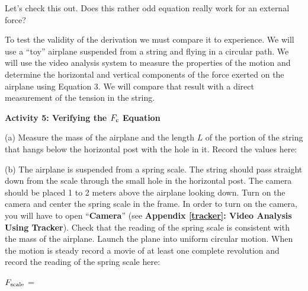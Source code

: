 Let's check this out. Does this rather odd equation really work for an external
force?

To test the validity of the derivation we must compare it to experience. We
will use a ``toy'' airplane suspended from a string and flying
in a circular path. We will use the video analysis system to measure the properties
of the motion and determine the horizontal and vertical components of the force
exerted on the airplane using Equation 3. We will compare that result with a
direct measurement of the tension in the string. 

\textbf{Activity 5: Verifying the \(F_{\rm c} \) Equation }

(a) Measure the mass of the airplane and the length $L$ of the portion of the
string that hangs below the horizontal post with the hole in it. Record the
values here: 
\vspace{10mm}

(b) The airplane is suspended from a spring scale. The string should pass straight down from the scale through the small hole in the horizontal post. The camera should be placed 1 to 2 meters above the airplane looking down. Turn on the camera and center the spring scale in the frame. In order to turn on the camera, you will have to open ``\textbf{Camera}'' (see \textbf{Appendix \ref{tracker}: Video Analysis Using Tracker}). Check that the reading of the spring scale is consistent with the mass of the airplane. 
Launch the plane into uniform circular motion. When the motion is steady record a movie of at least one complete revolution and record the reading of the spring scale here:
\vspace{5mm}

\hspace{0.5in} \( F_{\rm scale} \) = 
\vspace{5mm}

